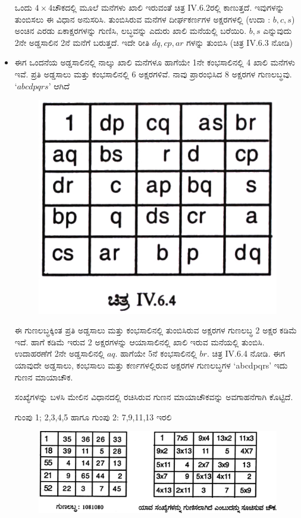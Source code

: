 \begin{itemize}
	ಒಂದು $4 \times 4$ಚೌಕದಲ್ಲಿ ಮೂಲೆ ಮನೆಗಳು ಖಾಲಿ ಇರುವಂತೆ ಚಿತ್ರ IV.6.2ರಲ್ಲಿ ಕಾಣು\-ತ್ತದೆ. ಇವುಗಳನ್ನು ತುಂಬಿಸಲು ಈ ವಿಧಾನ ಅನುಸರಿಸಿ. ತುಂಬಿಸಿರುವ ಮನೆಗಳ ದೀರ್ಘಕರ್ಣಗಳ ಅಕ್ಷರಗಳಲ್ಲಿ (ಉದಾ : $b, c, s$) ಅಂಚಿನ ಎರಡು ಏಕಾಕ್ಷರ\-ಗಳನ್ನು ಗುಣಿಸಿ, ಲಬ್ಧವನ್ನು ಎದುರು ಖಾಲಿ ಮನೆಯಲ್ಲಿ ಬರೆಯಿರಿ. $b, s$ ಎನ್ನುವುದು 2ನೇ ಅಡ್ಡಸಾಲಿನ 2ನೆ ಮನೆಗೆ ಬರುತ್ತದೆ. ಇದೇ ರೀತಿ $dq, cp, ar$ ಗಳನ್ನು ತುಂಬಿಸಿ (ಚಿತ್ರ IV.6.3 ನೋಡಿ)
	\item ಈಗ ಒಂದನೆಯ ಅಡ್ಡಸಾಲಿನಲ್ಲಿ ನಾಲ್ಕು ಖಾಲಿ ಮನೆಗಳೂ ಹಾಗೆಯೇ 1ನೇ ಕಂಭಸಾಲಿನಲ್ಲಿ 4 ಖಾಲಿ ಮನೆಗಳು ಇವೆ. ಪ್ರತಿ ಅಡ್ಡಸಾಲು ಮತ್ತು ಕಂಭಸಾಲಿನಲ್ಲಿ 6 ಅಕ್ಷರಗಳಿವೆ. ನಾವು ಪ್ರಾರಂಭಿಸಿದ 8 ಅಕ್ಷರಗಳ ಗುಣಲಬ್ಧವು. $‘abcdpqrs’$ ಆಗಿದೆ
	\begin{figure}[H]
	\includegraphics{src/figures/chap7/fig7-29.jpg}
	\end{figure}

	ಈ ಗುಣಲಬ್ಧಕ್ಕಿಂತ ಪ್ರತಿ ಅಡ್ಡಸಾಲು ಮತ್ತು ಕಂಭಸಾಲಿನಲ್ಲಿ ತುಂಬಿಸಿರುವ ಅಕ್ಷರಗಳ ಗುಣಲಬ್ಧ 2 ಅಕ್ಷರ ಕಡಿಮೆ ಇದೆ. ಹಾಗೆ ಕಡಿಮೆ ಇರುವ 2 ಅಕ್ಷರಗಳನ್ನು ಆಯಾಸಾಲಿನಲ್ಲಿ ಖಾಲಿ ಇರುವ ಮನೆಯಲ್ಲಿ ತುಂಬಿಸಿ. ಉದಾಹರಣೆಗೆ 2ನೇ ಅಡ್ಡಸಾಲಿನಲ್ಲಿ $aq$. ಹಾಗೆಯೇ 5ನೆ ಕಂಭಸಾಲಿನಲ್ಲಿ $br$. ಚಿತ್ರ IV.6.4 ನೋಡಿ. ಈಗ ಯಾವುದೇ ಅಡ್ಡಸಾಲು, ಕಂಭಸಾಲು ಮತ್ತು ಕರ್ಣಗಳಲ್ಲಿರುವ ಅಕ್ಷರಗಳ ಗುಣಲಬ್ಧಗಳ `abcdpqrs’ ಇದು ಗುಣನ ಮಾಯಾಚೌಕ.

	ಸಂಖ್ಯೆಗಳನ್ನು ಬಳಸಿ ಮೇಲಿನ ವಿಧಾನದಲ್ಲಿ ರಚಿಸಿರುವ ಗುಣನ ಮಾಯಾಚೌಕವನ್ನು ಅವಗಾಹನೆಗಾಗಿ ಕೊಟ್ಟಿದೆ.

	ಗುಂಪು 1; 2,3,4,5 ಹಾಗೂ ಗುಂಪು 2: 7,9,11,13 ಇರಲಿ
	\begin{figure}[H]
	\includegraphics{src/figures/chap7/fig7-30.jpg}
	\end{figure}
\end{itemize}

